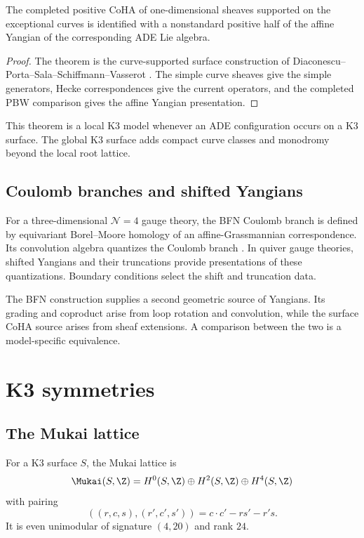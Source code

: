 \begin{theorem}
The completed positive CoHA of one-dimensional sheaves supported on the exceptional curves is identified with a nonstandard positive half of the affine Yangian of the corresponding ADE Lie algebra.
\end{theorem}
\begin{proof}
The theorem is the curve-supported surface construction of Diaconescu--Porta--Sala--Schiffmann--Vasserot \cite{DPPSSV}. The simple curve sheaves give the simple generators, Hecke correspondences give the current operators, and the completed PBW comparison gives the affine Yangian presentation.
\end{proof}

This theorem is a local K3 model whenever an ADE configuration occurs on a K3 surface. The global K3 surface adds compact curve classes and monodromy beyond the local root lattice.

\chapter{Coulomb branches and shifted Yangians}
For a three-dimensional $\mathcal N=4$ gauge theory, the BFN Coulomb branch is defined by equivariant Borel--Moore homology of an affine-Grassmannian correspondence. Its convolution algebra quantizes the Coulomb branch \cite{BFN}. In quiver gauge theories, shifted Yangians and their truncations provide presentations of these quantizations. Boundary conditions select the shift and truncation data.

The BFN construction supplies a second geometric source of Yangians. Its grading and coproduct arise from loop rotation and convolution, while the surface CoHA source arises from sheaf extensions. A comparison between the two is a model-specific equivalence.

\part{K3 symmetries}

\chapter{The Mukai lattice}
For a K3 surface $S$, the Mukai lattice is
\[
 \Mukai(S,\Z)=H^0(S,\Z)\oplus H^2(S,\Z)\oplus H^4(S,\Z)
\]
with pairing
\[
 ((r,c,s),(r',c',s'))=c\cdot c'-rs'-r's.
\]
It is even unimodular of signature $(4,20)$ and rank $24$.

